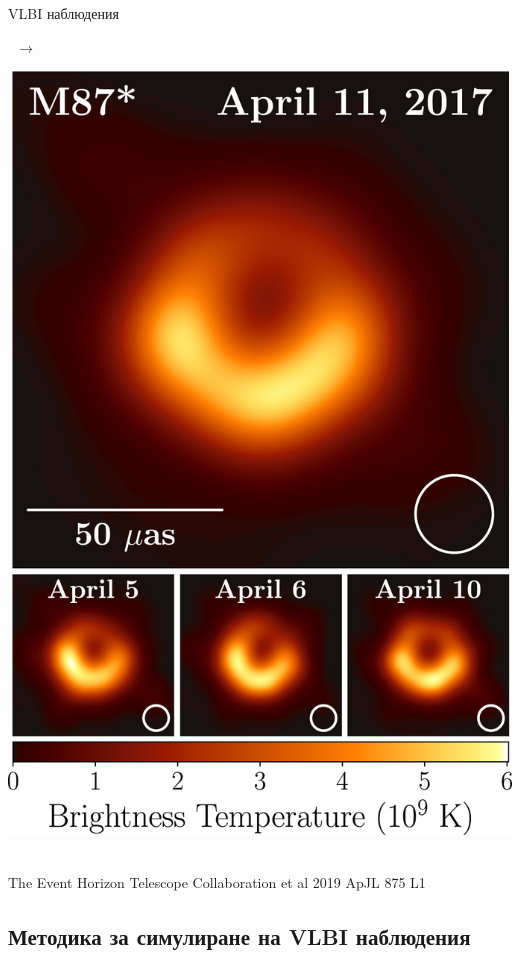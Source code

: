 \documentclass[hyperref={colorlinks,citecolor=blue,linkcolor=blue,urlcolor=blue}]{beamer}
\begin{document}
\begin{frame}{VLBI наблюдения}
\begin{minipage}{11em}
		\end{minipage}\,\,\,\huge$\rightarrow$
		\begin{minipage}{8em}
			\includegraphics[scale = 0.5]{Pre-Defence/M87.jpg}
		\end{minipage}\\
		
		\tiny The Event Horizon Telescope Collaboration et al 2019 ApJL 875 L1
		
	\end{frame}
	
	\subsection{Методика за симулиране на VLBI наблюдения}
	
\end{document}
